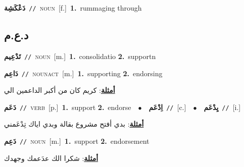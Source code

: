 \documentclass[10pt,a4paper,twoside]{article} %
\begin{document}
\begin{multicols}{2}
{\setlength\topsep{0pt}\textbf{\foreignlanguage{arabic}{دَعْكَشِة}}\ {\color{gray}\texttt{//}\color{black}}\ \textsc{noun}\ [f.]\ \textbf{1.}~rummaging through\ } \vspace{2mm}

\vspace{-3mm}
\subsection*{\color{blue}\foreignlanguage{arabic}{د.ع.م}\color{blue}{}} 

{\setlength\topsep{0pt}\textbf{\foreignlanguage{arabic}{تَدْعِيم}}\ {\color{gray}\texttt{//}\color{black}}\ \textsc{noun}\ [m.]\ \textbf{1.}~consolidatio  \textbf{2.}~supportn\ } \vspace{2mm}

{\setlength\topsep{0pt}\textbf{\foreignlanguage{arabic}{دَاعِم}}\ {\color{gray}\texttt{//}\color{black}}\ \textsc{noun\textunderscore act}\ [m.]\ \textbf{1.}~supporting  \textbf{2.}~endorsing\  \begin{flushright}\color{gray}\foreignlanguage{arabic}{\textbf{\underline{\foreignlanguage{arabic}{أمثلة}}}: كريم كان من أكبر الداعمين الي}\end{flushright}\color{black}} \vspace{2mm}

{\setlength\topsep{0pt}\textbf{\foreignlanguage{arabic}{دَعَم}}\ {\color{gray}\texttt{//}\color{black}}\ \textsc{verb}\ [p.]\ \textbf{1.}~support  \textbf{2.}~endorse\ \ $\bullet$\ \ \setlength\topsep{0pt}\textbf{\foreignlanguage{arabic}{اِدْعَم}}\ {\color{gray}\texttt{//}\color{black}}\ [c.]\ \ $\bullet$\ \ \setlength\topsep{0pt}\textbf{\foreignlanguage{arabic}{يِدْعَم}}\ {\color{gray}\texttt{//}\color{black}}\ [i.]\  \begin{flushright}\color{gray}\foreignlanguage{arabic}{\textbf{\underline{\foreignlanguage{arabic}{أمثلة}}}: بدي أفتح مشروع بقالة وبدي اياك تِدْعَمني}\end{flushright}\color{black}} \vspace{2mm}

{\setlength\topsep{0pt}\textbf{\foreignlanguage{arabic}{دَعِم}}\ {\color{gray}\texttt{//}\color{black}}\ \textsc{noun}\ [m.]\ \textbf{1.}~support  \textbf{2.}~endorsement\  \begin{flushright}\color{gray}\foreignlanguage{arabic}{\textbf{\underline{\foreignlanguage{arabic}{أمثلة}}}: شكرا الك عدَعمك وجهدك}\end{flushright}\color{black}} \vspace{2mm}


\end{multicols}
\end{document}
